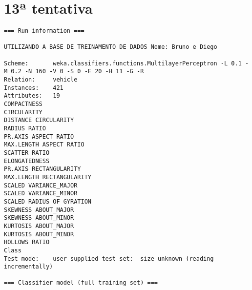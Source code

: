\documentclass[
	article,			%
	11pt,				%
	oneside,			%
	a4paper,			%
	english,			%
	brazil,				%
	sumario=tradicional
	]{abntex2}
\begin{document}
\section{13ª tentativa}

\begin{lstlisting}
=== Run information ===

UTILIZANDO A BASE DE TREINAMENTO DE DADOS Nome: Bruno e Diego

Scheme:       weka.classifiers.functions.MultilayerPerceptron -L 0.1 -M 0.2 -N 160 -V 0 -S 0 -E 20 -H 11 -G -R
Relation:     vehicle
Instances:    421
Attributes:   19
COMPACTNESS
CIRCULARITY
DISTANCE CIRCULARITY
RADIUS RATIO
PR.AXIS ASPECT RATIO
MAX.LENGTH ASPECT RATIO
SCATTER RATIO
ELONGATEDNESS
PR.AXIS RECTANGULARITY
MAX.LENGTH RECTANGULARITY
SCALED VARIANCE_MAJOR
SCALED VARIANCE_MINOR
SCALED RADIUS OF GYRATION
SKEWNESS ABOUT_MAJOR
SKEWNESS ABOUT_MINOR
KURTOSIS ABOUT_MAJOR
KURTOSIS ABOUT_MINOR
HOLLOWS RATIO
Class
Test mode:    user supplied test set:  size unknown (reading incrementally)

=== Classifier model (full training set) ===


\end{lstlisting}
\end{document}
